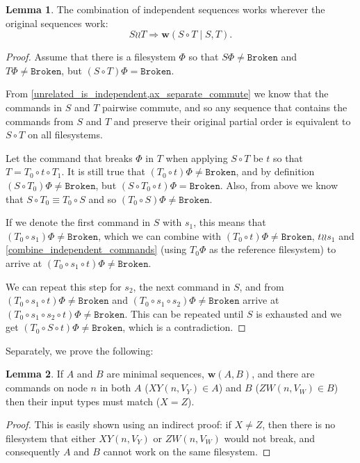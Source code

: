 \documentclass[12pt]{article}
\newcommand{\fsbroken}{\mathtt{Broken}} %
\newcommand{\FS}{\Phi} %
\newcommand{\fscommand}[2]{{#1#2}}
\newcommand{\cxy}{\fscommand{X}{Y}}
\newcommand{\czw}{\fscommand{Z}{W}}
\newcommand{\cc}{\circ} %
\newcommand{\indep}{\mathrel{\wr\wr}} %
\newcommand{\workssign}{\mathbf{w}}
\newcommand{\works}[1]{\workssign({#1})}
\newcommand{\worksc}[2]{\workssign({#1}\mathrel{|}{#2})}
\theoremstyle{definition}
\newtheorem{mylem}{Lemma}
\begin{document}
\begin{mylem}\label{combine_independent_sequences}
The combination of independent sequences works wherever the original sequences work:
\[ S\indep T \Rightarrow \worksc{S\cc T}{S,T}. \]
\end{mylem}
\begin{proof}
Assume that there is a filesystem $\FS$ so that
$S\FS\neq\fsbroken$ and $T\FS\neq\fsbroken$, but
$(S\cc T)\FS=\fsbroken$.

From \cref{unrelated_is_independent,ax_separate_commute} we know that
the commands in $S$ and $T$ pairwise commute, and so any sequence
that contains the commands from $S$ and $T$ and preserve their original partial order
is equivalent to $S\cc T$ on all filesystems.

Let the command that breaks $\FS$ in $T$ when applying $S\cc T$ be $t$
so that $T=T_0\cc t\cc T_1$.
It is still true that $(T_0 \cc t)\FS\neq\fsbroken$,
and by definition $(S\cc T_0)\FS\neq\fsbroken$,
but $(S\cc T_0\cc t)\FS=\fsbroken$.
Also, from above we know that $S\cc T_0\equiv T_0\cc S$
and so $(T_0 \cc S)\FS\neq\fsbroken$.

If we denote the first command in $S$ with $s_1$,
this means that $(T_0 \cc s_1)\FS\neq\fsbroken$,
which we can combine with $(T_0 \cc t)\FS\neq\fsbroken$, $t\indep s_1$ and
\cref{combine_independent_commands}
(using $T_0\FS$ as the reference filesystem)
to arrive at $(T_0 \cc s_1\cc t)\FS\neq\fsbroken$.

We can repeat this step for $s_2$, the next command in $S$,
and from 
$(T_0 \cc s_1\cc t)\FS\neq\fsbroken$
and
$(T_0 \cc s_1\cc s_2)\FS\neq\fsbroken$
arrive at
$(T_0 \cc s_1\cc s_2\cc t)\FS\neq\fsbroken$.
This can be repeated until $S$ is exhausted and we get
$(T_0 \cc S\cc t)\FS\neq\fsbroken$, which is a contradiction.
\end{proof}

Separately, we prove the following:

\begin{mylem}\label{worksinputmatch}
If $A$ and $B$ are minimal sequences, $\works{A,B}$,
and there are commands on node $n$ in both $A$ ($\cxy(n, V_Y)\in A$) and $B$ ($\czw(n, V_W)\in B$)
then their input types must match ($X=Z$).
\end{mylem}
\begin{proof}
This is easily shown using an indirect proof: if $X\neq Z$, then there is no filesystem that
either $\cxy(n, V_Y)$ or $\czw(n, V_W)$ would not break, 
and consequently $A$ and $B$ cannot work on the same filesystem.
\end{proof}
\end{document}
